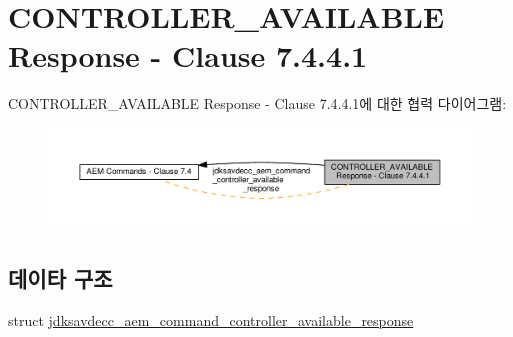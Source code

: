 \hypertarget{group__command__controller__available__response}{}\section{C\+O\+N\+T\+R\+O\+L\+L\+E\+R\+\_\+\+A\+V\+A\+I\+L\+A\+B\+LE Response -\/ Clause 7.4.4.1}
\label{group__command__controller__available__response}
C\+O\+N\+T\+R\+O\+L\+L\+E\+R\+\_\+\+A\+V\+A\+I\+L\+A\+B\+LE Response -\/ Clause 7.4.4.1에 대한 협력 다이어그램\+:
\nopagebreak
\begin{figure}[H]
\begin{center}
\leavevmode
\includegraphics[width=350pt]{group__command__controller__available__response}
\end{center}
\end{figure}
\subsection*{데이타 구조}
\begin{DoxyCompactItemize}
\item 
struct \hyperlink{structjdksavdecc__aem__command__controller__available__response}{jdksavdecc\+\_\+aem\+\_\+command\+\_\+controller\+\_\+available\+\_\+response}
\end{DoxyCompactItemize}
